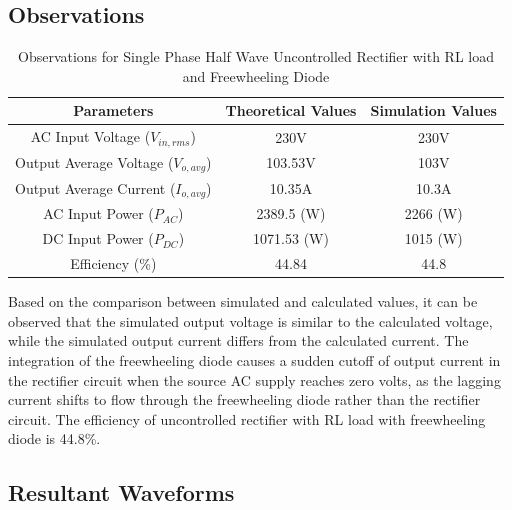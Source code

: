 \subsection{Observations}

\begin{table}[h]
    \renewcommand{\arraystretch}{1.3}
    \label{table_observation_3}
    \centering
    \begin{tabular}{|c|c|c|}
        \hline
        Parameters                              & Theoretical Values & Simulation Values \\
        \hline
        \hline
        AC Input Voltage ($ V_{in,rms} $)       & 230V               & 230V              \\
        \hline
        Output Average Voltage ($ V_{o,avg} $)  & 103.53V            & 103V              \\
        \hline
        Output Average Current ($ I_{o,avg}  $) & 10.35A             & 10.3A             \\
        \hline
        AC Input Power ($ P_{AC}  $)            & 2389.5 (W)         & 2266 (W)          \\
        \hline
        DC Input Power ($ P_{DC}  $)            & 1071.53 (W)        & 1015 (W)          \\
        \hline
        Efficiency (\%)                         & 44.84              & 44.8              \\
        \hline
    \end{tabular}
    \caption{Observations for Single Phase Half Wave Uncontrolled Rectifier with RL load and Freewheeling Diode}

\end{table}



Based on the comparison between simulated and calculated values, it can be observed that the simulated output voltage is similar to the calculated voltage, while the simulated output current differs from the calculated current. The integration of the freewheeling diode causes a sudden cutoff of output current in the rectifier circuit when the source AC supply reaches zero volts, as the lagging current shifts to flow through the freewheeling diode rather than the rectifier circuit.
The efficiency of uncontrolled rectifier with RL load with freewheeling diode is 44.8\%.

\pagebreak

\subsection{Resultant Waveforms}


